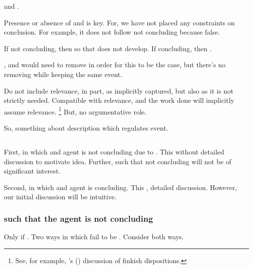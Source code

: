 \begin{note}
  \ninf{} and .

  Presence or absence of \ninf{} and  is key.
  For, we have not placed any constraints on conclusion.
  For example, it does not follow not concluding because false.

  If not concluding, then \ninf{} so that does not develop.
  If concluding, then \fc{}.



  \ninf{}, and would need to remove \ninf{} in order for this to be the case, but there's no removing \ninf{} while keeping the same event.

  Do not include relevance, in part, as implicitly captured, but also as it is not strictly needed.
  Compatible with relevance, and the work done will implicitly assume relevance.%
  \footnote{
    See, for example, \citeauthor{Lewis:1997wg}'s (\citeyear{Lewis:1997wg}) discussion of finkish dispositions.
  }
  But, no argumentative role.
\end{note}

\begin{note}
  So, something about description which regulates event.
\end{note}

\subsection{}
\label{cha:requs:sec:illu3}

\begin{note}
  First,  in which \requ{} and agent is not concluding due to \requ{}.
  This  without detailed discussion to motivate idea.
  Further,  such that not concluding will not be of significant interest.

  Second,  in which \requ{} and agent is concluding.
  This , detailed discussion.
  However, our initial discussion will be intuitive.
\end{note}

\subsubsection{ such that the agent is not concluding}

\begin{note}
  Only if \fc{}.
  Two ways in which fail to be \fc{}.
  Consider both ways.
\end{note}

